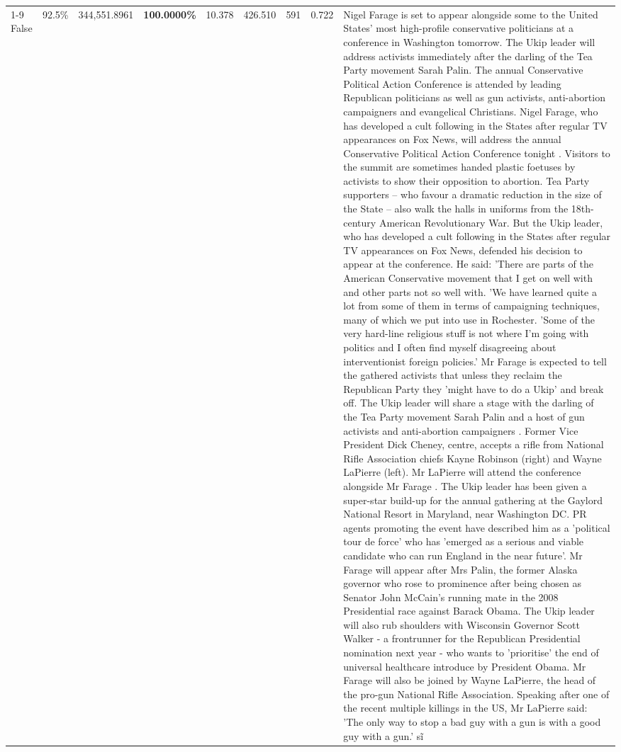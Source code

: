 \begin{table}[H]
\begin{tabular}{lllrlllll}
\cline{1-9}
False & 92.5\% & 344,551.8961 & \bfseries \color{red} 100.0000\% & 10.378 & 426.510 & 591 & 0.722 & Nigel Farage is set to appear alongside some to the United States' most high-profile conservative politicians at a conference in Washington tomorrow. The Ukip leader will address activists immediately after the darling of the Tea Party movement Sarah Palin. The annual Conservative Political Action Conference is attended by leading Republican politicians as well as gun activists, anti-abortion campaigners and evangelical Christians. Nigel Farage, who has developed a cult following in the States after regular TV appearances on Fox News, will address the annual Conservative Political Action Conference tonight . Visitors to the summit are sometimes handed plastic foetuses by activists to show their opposition to abortion. Tea Party supporters – who favour a dramatic reduction in the size of the State – also walk the halls in uniforms from the 18th-century American Revolutionary War. But the Ukip leader, who has developed a cult following in the States after regular TV appearances on Fox News, defended his decision to appear at the conference. He said: 'There are parts of the American Conservative movement that I get on well with and other parts not so well with. 'We have learned quite a lot from some of them in terms of campaigning techniques, many of which we put into use in Rochester. 'Some of the very hard-line religious stuff is not where I'm going with politics and I often find myself disagreeing about interventionist foreign policies.' Mr Farage is expected to tell the gathered activists that unless they reclaim the Republican Party they 'might have to do a Ukip' and break off. The Ukip leader will share a stage with the darling of the Tea Party movement Sarah Palin and a host of gun activists and anti-abortion campaigners . Former Vice President Dick Cheney, centre, accepts a rifle from National Rifle Association chiefs Kayne Robinson (right) and Wayne LaPierre (left). Mr LaPierre will attend the conference alongside Mr Farage . The Ukip leader has been given a super-star build-up for the annual gathering at the Gaylord National Resort in Maryland, near Washington DC. PR agents promoting the event have described him as a 'political tour de force' who has 'emerged as a serious and viable candidate who can run England in the near future'. Mr Farage will appear after Mrs Palin, the former Alaska governor who rose to prominence after being chosen as Senator John McCain's running mate in the 2008 Presidential race against Barack Obama. The Ukip leader will also rub shoulders with Wisconsin Governor Scott Walker - a frontrunner for the Republican Presidential nomination next year - who wants to 'prioritise' the end of universal healthcare introduce by President Obama. Mr Farage will also be joined by Wayne LaPierre, the head of the pro-gun National Rifle Association. Speaking after one of the recent multiple killings in the US, Mr LaPierre said: 'The only way to stop a bad guy with a gun is with a good guy with a gun.' sĩ \\

\end{tabular}
\end{table}
